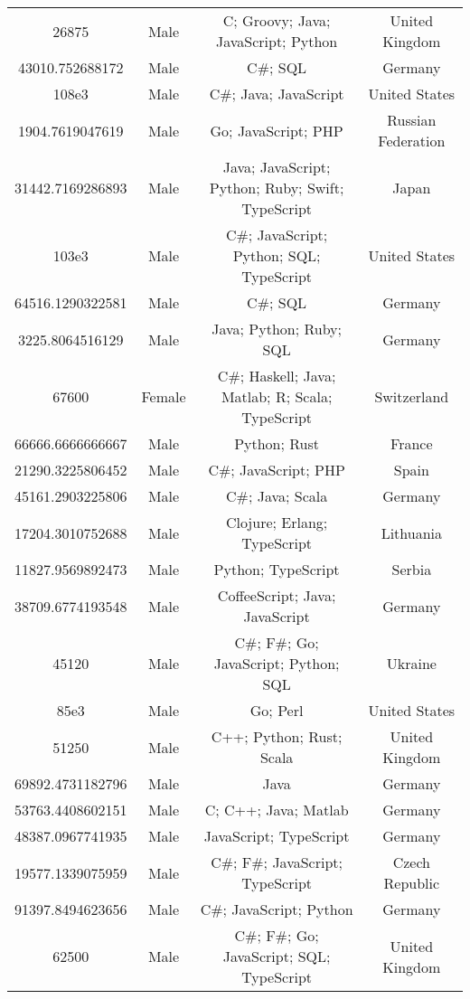 \begin{center}
\begin{tabular}{ |c|c|c|c| }
26875  &  Male  &  C; Groovy; Java; JavaScript; Python  &  United Kingdom  \\ 
43010.752688172  &  Male  &  C\#; SQL  &  Germany  \\ 
108e3  &  Male  &  C\#; Java; JavaScript  &  United States  \\ 
1904.7619047619  &  Male  &  Go; JavaScript; PHP  &  Russian Federation  \\ 
31442.7169286893  &  Male  &  Java; JavaScript; Python; Ruby; Swift; TypeScript  &  Japan  \\ 
103e3  &  Male  &  C\#; JavaScript; Python; SQL; TypeScript  &  United States  \\ 
64516.1290322581  &  Male  &  C\#; SQL  &  Germany  \\ 
3225.8064516129  &  Male  &  Java; Python; Ruby; SQL  &  Germany  \\ 
67600  &  Female  &  C\#; Haskell; Java; Matlab; R; Scala; TypeScript  &  Switzerland  \\ 
66666.6666666667  &  Male  &  Python; Rust  &  France  \\ 
21290.3225806452  &  Male  &  C\#; JavaScript; PHP  &  Spain  \\ 
45161.2903225806  &  Male  &  C\#; Java; Scala  &  Germany  \\ 
17204.3010752688  &  Male  &  Clojure; Erlang; TypeScript  &  Lithuania  \\ 
11827.9569892473  &  Male  &  Python; TypeScript  &  Serbia  \\ 
38709.6774193548  &  Male  &  CoffeeScript; Java; JavaScript  &  Germany  \\ 
45120  &  Male  &  C\#; F\#; Go; JavaScript; Python; SQL  &  Ukraine  \\ 
85e3  &  Male  &  Go; Perl  &  United States  \\ 
51250  &  Male  &  C++; Python; Rust; Scala  &  United Kingdom  \\ 
69892.4731182796  &  Male  &  Java  &  Germany  \\ 
53763.4408602151  &  Male  &  C; C++; Java; Matlab  &  Germany  \\ 
48387.0967741935  &  Male  &  JavaScript; TypeScript  &  Germany  \\ 
19577.1339075959  &  Male  &  C\#; F\#; JavaScript; TypeScript  &  Czech Republic  \\ 
91397.8494623656  &  Male  &  C\#; JavaScript; Python  &  Germany  \\ 
62500  &  Male  &  C\#; F\#; Go; JavaScript; SQL; TypeScript  &  United Kingdom  \\ 

\end{tabular}
\end{center}
